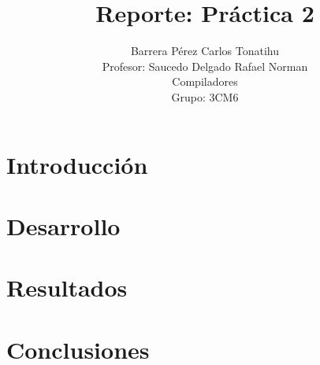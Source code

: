 \documentclass[titlepage]{article}
\title{Reporte: Práctica 2}
\author{Barrera Pérez Carlos Tonatihu \\ Profesor: Saucedo Delgado Rafael Norman \\ Compiladores \\ Grupo: 3CM6 }
\begin{document}
	\maketitle
	\tableofcontents
	\newpage
	\section{Introducción}
	\section{Desarrollo}
	\section{Resultados}
	\section{Conclusiones}
\end{document}
